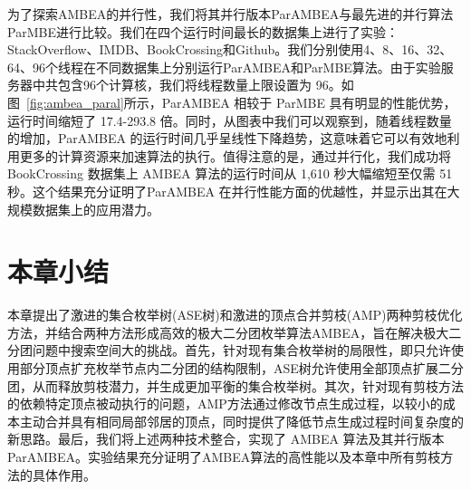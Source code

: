 为了探索AMBEA的并行性，我们将其并行版本ParAMBEA与最先进的并行算法ParMBE进行比较。我们在四个运行时间最长的数据集上进行了实验：StackOverflow、IMDB、BookCrossing和Github。我们分别使用4、8、16、32、64、96个线程在不同数据集上分别运行ParAMBEA和ParMBE算法。由于实验服务器中共包含96个计算核，我们将线程数量上限设置为 96。如图~\ref{fig:ambea_paral}所示，ParAMBEA 相较于 ParMBE 具有明显的性能优势，运行时间缩短了 17.4-293.8 倍。同时，从图表中我们可以观察到，随着线程数量的增加，ParAMBEA 的运行时间几乎呈线性下降趋势，这意味着它可以有效地利用更多的计算资源来加速算法的执行。值得注意的是，通过并行化，我们成功将 BookCrossing 数据集上 AMBEA 算法的运行时间从 1,610 秒大幅缩短至仅需 51 秒。这个结果充分证明了ParAMBEA 在并行性能方面的优越性，并显示出其在大规模数据集上的应用潜力。

\section{本章小结}

本章提出了激进的集合枚举树(ASE树)和激进的顶点合并剪枝(AMP)两种剪枝优化方法，并结合两种方法形成高效的极大二分团枚举算法AMBEA，旨在解决极大二分团问题中搜索空间大的挑战。首先，针对现有集合枚举树的局限性，即只允许使用部分顶点扩充枚举节点内二分团的结构限制，ASE树允许使用全部顶点扩展二分团，从而释放剪枝潜力，并生成更加平衡的集合枚举树。其次，针对现有剪枝方法的依赖特定顶点被动执行的问题，AMP方法通过修改节点生成过程，以较小的成本主动合并具有相同局部邻居的顶点，同时提供了降低节点生成过程时间复杂度的新思路。最后，我们将上述两种技术整合，实现了 AMBEA 算法及其并行版本 ParAMBEA。实验结果充分证明了AMBEA算法的高性能以及本章中所有剪枝方法的具体作用。
